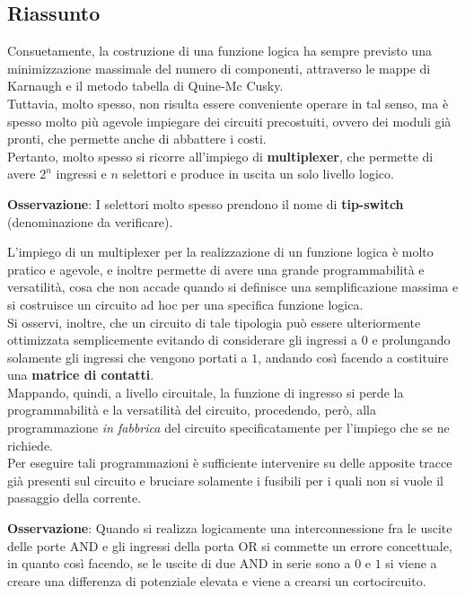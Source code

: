 \documentclass[a4paper]{extarticle}
\begin{document}
\subsection{Riassunto}
Consuetamente, la costruzione di una funzione logica ha sempre previsto una minimizzazione massimale del numero di componenti, attraverso le mappe di Karnaugh e il metodo tabella di Quine-Mc Cusky.\\
Tuttavia, molto spesso, non risulta essere conveniente operare in tal senso, ma è spesso molto più agevole impiegare dei circuiti precostuiti, ovvero dei moduli già pronti, che permette anche di abbattere i costi.\\
Pertanto, molto spesso si ricorre all'impiego di \textbf{multiplexer}, che permette di avere \(2^n\) ingressi e \(n\) selettori e produce in uscita un solo livello logico.

\vspace{1em}
\noindent
\textbf{Osservazione}: I selettori molto spesso prendono il nome di \textbf{tip-switch} (denominazione da verificare).

\vspace{1em}
\noindent
L'impiego di un multiplexer per la realizzazione di un funzione logica è molto pratico e agevole, e inoltre permette di avere una grande programmabilità e versatilità, cosa che non accade quando si definisce una semplificazione massima e si costruisce un circuito ad hoc per una specifica funzione logica.\\
Si osservi, inoltre, che un circuito di tale tipologia può essere ulteriormente ottimizzata semplicemente evitando di considerare gli ingressi a \(0\) e prolungando solamente gli ingressi che vengono portati a \(1\), andando così facendo a costituire una \textbf{matrice di contatti}.\\
Mappando, quindi, a livello circuitale, la funzione di ingresso si perde la programmabilità e la versatilità del circuito, procedendo, però, alla programmazione \textit{in fabbrica} del circuito specificatamente per l'impiego che se ne richiede.\\
Per eseguire tali programmazioni è sufficiente intervenire su delle apposite tracce già presenti sul circuito e bruciare solamente i fusibili per i quali non si vuole il passaggio della corrente.

\vspace{1em}
\noindent
\textbf{Osservazione}: Quando si realizza logicamente una interconnessione fra le uscite delle porte AND e gli ingressi della porta OR si commette un errore concettuale, in quanto così facendo, se le uscite di due AND in serie sono a \(0\) e \(1\) si viene a creare una differenza di potenziale elevata e viene a crearsi un cortocircuito.
\end{document}
